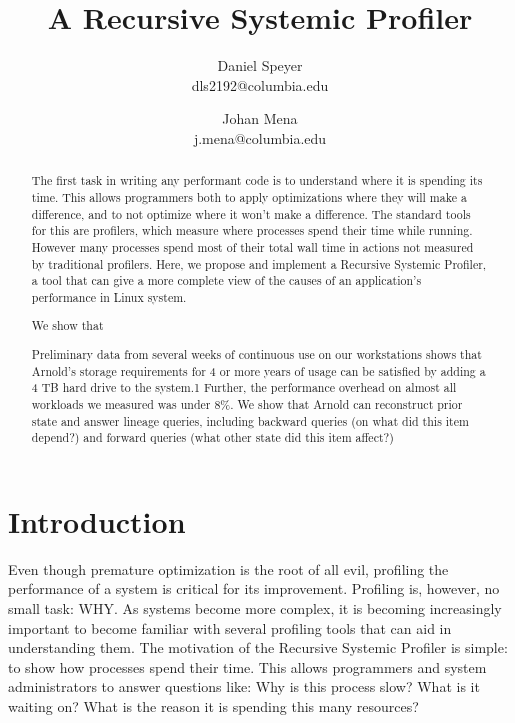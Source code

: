\documentclass[10pt]{article}
\begin{document}
\author{Daniel Speyer\\dls2192@columbia.edu \and Johan Mena\\j.mena@columbia.edu}
\title{A Recursive Systemic Profiler}

\twocolumn[
\begin{@twocolumnfalse}
\maketitle

\end{@twocolumnfalse}
]

\begin{abstract}
The first task in writing any performant code is to understand where it is spending its time. This allows programmers both to apply optimizations where they will make a difference, and to not optimize where it won't make a difference. The standard tools for this are profilers, which measure where processes spend their time while running. However many processes spend most of their total wall time in actions not measured by traditional profilers. Here, we propose and implement a Recursive Systemic Profiler, a tool that can give a more complete view of the causes of an application’s performance in Linux system.

We show that 

Preliminary
data from several weeks of continuous use on our workstations
shows that Arnold’s storage requirements for 4
or more years of usage can be satisfied by adding a 4 TB
hard drive to the system.1 Further, the performance overhead
on almost all workloads we measured was under
8\%. We show that Arnold can reconstruct prior state and
answer lineage queries, including backward queries (on
what did this item depend?) and forward queries (what
other state did this item affect?)
\end{abstract}

\section{Introduction}
Even though premature optimization is the root of all evil, profiling the performance of a system is critical for its improvement. Profiling is, however, no small task: WHY. As systems become more complex, it is becoming increasingly important to become familiar with several profiling tools that can aid in understanding them. The motivation of the Recursive Systemic Profiler is simple: to show how processes spend their time. This allows programmers and system administrators to answer questions like: Why is this process slow? What is it waiting on? What is the reason it is spending this many resources?
\end{document}
